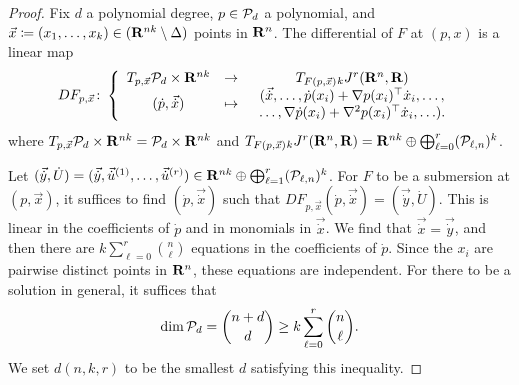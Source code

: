 \begin{proof}
  Fix $d$ a polynomial degree, $p \in \mathcal{P}_d$ a polynomial, and $\vec{x} \coloneq (x_1, \ldots, x_k) \in (\mathbf{R}^{nk} \setminus \Delta)$ points in $\mathbf{R}^n$. The differential of $F$ at $(p, x)$ is a linear map
  \[
    DF_{p, \vec{x}} \colon \left\{ \begin{array}{ccc}
      T_{p, \vec{x}} \mathcal{P}_d \times \mathbf{R}^{nk}
      & \to
      & T_{F(p, \vec{x})} {}_k J^r(\mathbf{R}^n, \mathbf{R})
    \\
      (\dot{p}, \vec{\dot{x}})
      & \mapsto
      & \begin{array}{c}
        (\vec{\dot{x}}, \ldots, \dot{p}(x_i) + \nabla p(x_i)^\top \dot{x}_i, \ldots, \\
        \ldots, \nabla \dot{p}(x_i) + \nabla^2 p(x_i)^\top \dot{x}_i, \ldots).
      \end{array}
    \end{array} \right.
  \]
  where $T_{p, \vec{x}} \mathcal{P}_d \times \mathbf{R}^{nk} = \mathcal{P}_d \times \mathbf{R}^{nk}$ and $T_{F(p, \vec{x})} {}_k J^r(\mathbf{R}^n, \mathbf{R}) = \mathbf{R}^{nk} \oplus \bigoplus_{\ell = 0}^r (\mathcal{P}_{\ell, n})^k$.

  Let $(\vec{\dot{y}}, \dot{U}) = (\vec{\dot{y}}, \vec{\dot{u}}^{(1)}, \ldots, \vec{\dot{u}}^{(r)}) \in \mathbf{R}^{nk} \oplus \bigoplus_{\ell = 1}^r (\mathcal{P}_{\ell, n})^k$. For $F$ to be a submersion at $(p, \vec{x})$, it suffices to find $(\dot{p}, \vec{\dot{x}})$ such that $DF_{p, \vec{x}}(\dot{p}, \vec{\dot{x}}) = (\vec{\dot{y}}, \dot{U})$. This is linear in the coefficients of $\dot{p}$ and in monomials in $\vec{\dot{x}}$. We find that $\vec{\dot{x}} = \vec{\dot{y}}$, and then there are $k \sum_{\ell = 0}^r \binom{n}{\ell}$ equations in the coefficients of $\dot{p}$. Since the $x_i$ are pairwise distinct points in $\mathbf{R}^n$, these equations are independent. For there to be a solution in general, it suffices that
  \[
    \dim \mathcal{P}_d = \binom{n + d}{d} \geq k \sum_{\ell = 0}^r \binom{n}{\ell}.
  \]
  We set $d(n, k, r)$ to be the smallest $d$ satisfying this inequality.
\end{proof}

